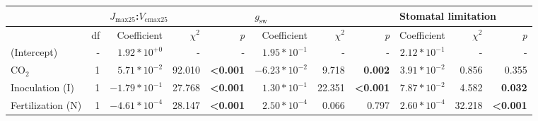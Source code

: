 \begin{landscape}
\begin{table}
{\begin{tabular}{p{3cm}p{0.5cm}p{1.75cm}p{1.5cm}p{1.5cm}p{1.75cm}p{1.5cm}p{1.5cm}p{1.75cm}p{1.5cm}p{1.5cm}}
            && \multicolumn{3}{l}{$J_{\mathrm{max25}}$:$V_\mathrm{cmax25}$} 
            &  \multicolumn{3}{l}{$g_{\mathrm{sw}}$}
            &  \multicolumn{3}{l}{Stomatal limitation}
            \\
            \hline
            & \multicolumn{1}{r}{df}
            & \multicolumn{1}{r}{Coefficient}   & \multicolumn{1}{r}{$\chi^2$}    & \multicolumn{1}{r}{\textit{p}}
            & \multicolumn{1}{r}{Coefficient}   & \multicolumn{1}{r}{$\chi^2$}    & \multicolumn{1}{r}{\textit{p}} 
            & \multicolumn{1}{r}{Coefficient}   & \multicolumn{1}{r}{$\chi^2$}    & \multicolumn{1}{r}{\textit{p}}  
            \\
            \hline

            (Intercept) & \multicolumn{1}{r}{-}
            & \multicolumn{1}{r}{$1.92*10^{+0}$}      & \multicolumn{1}{r}{-}             & \multicolumn{1}{r}{-}
            & \multicolumn{1}{r}{$1.95*10^{-1}$}      & \multicolumn{1}{r}{-}             & \multicolumn{1}{r}{-}
            & \multicolumn{1}{r}{$2.12*10^{-1}$}      & \multicolumn{1}{r}{-}             & \multicolumn{1}{r}{-}
            \\

            CO$_2$ & \multicolumn{1}{r}{1}
            & \multicolumn{1}{r}{$5.71*10^{-2}$}     & \multicolumn{1}{r}{92.010}        & \multicolumn{1}{r}{\textbf{<0.001}}
            & \multicolumn{1}{r}{$-6.23*10^{-2}$}     & \multicolumn{1}{r}{9.718}         & \multicolumn{1}{r}{\textbf{ 0.002}}
            & \multicolumn{1}{r}{$3.91*10^{-2}$}     & \multicolumn{1}{r}{0.856}         & \multicolumn{1}{r}{0.355} 
            \\

            Inoculation (I) & \multicolumn{1}{r}{1}
            & \multicolumn{1}{r}{$-1.79*10^{-1}$}     & \multicolumn{1}{r}{27.768}        & \multicolumn{1}{r}{\textbf{<0.001}}
            & \multicolumn{1}{r}{$1.30*10^{-1}$}     & \multicolumn{1}{r}{22.351}        & \multicolumn{1}{r}{\textbf{<0.001}}
            & \multicolumn{1}{r}{$7.87*10^{-2}$}     & \multicolumn{1}{r}{4.582}         & \multicolumn{1}{r}{\textbf{ 0.032}} 
            \\

            Fertilization (N) & \multicolumn{1}{r}{1}
            & \multicolumn{1}{r}{$-4.61*10^{-4}$}     & \multicolumn{1}{r}{28.147}        & \multicolumn{1}{r}{\textbf{<0.001}}
            & \multicolumn{1}{r}{$2.50*10^{-4}$}     & \multicolumn{1}{r}{0.066}         & \multicolumn{1}{r}{0.797}
            & \multicolumn{1}{r}{$2.60*10^{-4}$}     & \multicolumn{1}{r}{32.218}        & \multicolumn{1}{r}{\textbf{<0.001}} 
            \\


\end{tabular}}
\end{table}
\end{landscape}
